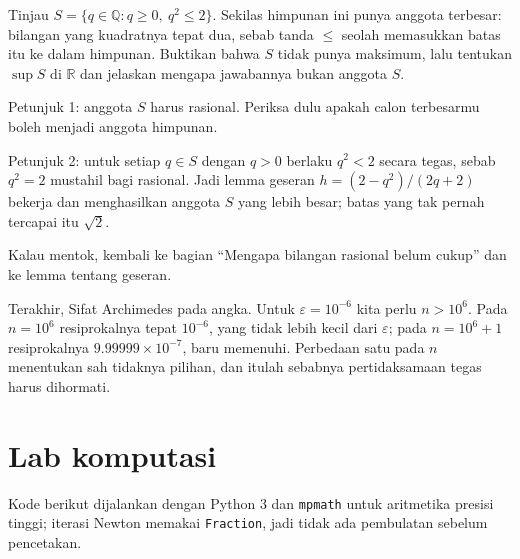 \begin{tantangan}
Tinjau $S=\{q\in\mathbb{Q}: q\ge 0,\ q^2\le 2\}$. Sekilas himpunan ini punya anggota
terbesar: bilangan yang kuadratnya tepat dua, sebab tanda $\le$ seolah memasukkan batas
itu ke dalam himpunan. Buktikan bahwa $S$ tidak punya maksimum, lalu tentukan $\sup S$
di $\mathbb{R}$ dan jelaskan mengapa jawabannya bukan anggota $S$.

Petunjuk 1: anggota $S$ harus rasional. Periksa dulu apakah calon terbesarmu boleh
menjadi anggota himpunan.

Petunjuk 2: untuk setiap $q\in S$ dengan $q>0$ berlaku $q^2<2$ secara tegas, sebab
$q^2=2$ mustahil bagi rasional. Jadi lemma geseran $h=(2-q^2)/(2q+2)$ bekerja dan
menghasilkan anggota $S$ yang lebih besar; batas yang tak pernah tercapai itu $\sqrt2$.

Kalau mentok, kembali ke bagian ``Mengapa bilangan rasional belum cukup'' dan ke lemma
tentang geseran.
\end{tantangan}

Terakhir, Sifat Archimedes pada angka. Untuk $\varepsilon=10^{-6}$ kita perlu
$n>10^{6}$. Pada $n=10^{6}$ resiprokalnya tepat $10^{-6}$, yang tidak lebih kecil dari
$\varepsilon$; pada $n=10^{6}+1$ resiprokalnya $9.99999\times10^{-7}$, baru memenuhi.
Perbedaan satu pada $n$ menentukan sah tidaknya pilihan, dan itulah sebabnya
pertidaksamaan tegas harus dihormati.


\section{Lab komputasi}

Kode berikut dijalankan dengan Python 3 dan \texttt{mpmath} untuk aritmetika presisi
tinggi; iterasi Newton memakai \texttt{Fraction}, jadi tidak ada pembulatan sebelum
pencetakan.

